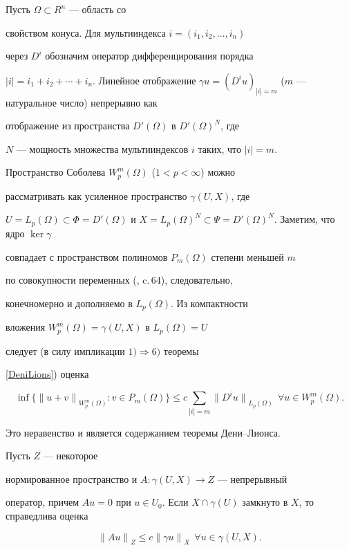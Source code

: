 \begin{examnonum}


Пусть $\Omega \subset R^n$ --- область со


свойством конуса. Для мультииндекса $i=(i_1, i_2, \dotsc, i_n)$


через $D^i$ обозначим оператор дифференцирования порядка


$|i|=i_1+i_2+\dotsb+i_n$. Линейное отображение $\gamma u =


(D^i u)_{|i|=m}$ ($m$ --- натуральное число) непрерывно как


отображение из пространства $D'(\Omega)$ в $D'(\Omega)^N$, где


$N$ --- мощность множества мультииндексов $i$ таких, что $|i|=m$.


Пространство Соболева $W^m_p(\Omega)$ ($1<p<\infty$) можно


рассматривать как усиленное пространство $\gamma(U,X)$, где


$U=L_p(\Omega) \subset \Phi=D'(\Omega)$ и $X=L_p(\Omega)^N


\subset \Psi=D'(\Omega)^N$. Заметим, что ядро $\ker \gamma$


совпадает с пространством полиномов $P_m(\Omega)$ степени меньшей $m$


по совокупности переменных (\cite{Sobolev}, c.\,64), следовательно,


конечномерно и дополняемо в $L_p(\Omega)$. Из компактности


вложения $W^m_p(\Omega)=\gamma(U,X)$ в $L_p(\Omega)=U$


следует (в силу импликации $1) \Rightarrow 6)$ теоремы


\ref{DeniLions}) оценка


$$


\inf \{ {\|u+v\|}_{W^m_p(\Omega)} : v \in P_m(\Omega) \}


\leq c \sum_{|i|=m} {\|D^i u\|}_{L_p(\Omega)} \ \ \forall u


\in W^m_p(\Omega).


$$


Это неравенство и является содержанием теоремы Дени--Лионса.


\end{examnonum}





\begin{cornonum}


Пусть $Z$ --- некоторое


нормированное пространство и $A:\gamma(U,X) \to Z$ --- непрерывный


оператор, причем $Au=0$ при $u \in U_0$. Если $X \cap


\gamma(U)$ замкнуто в $X$, то справедлива оценка


$$


{\|Au\|}_Z \le c {\|\gamma u\|}_X \ \ \forall u \in


\gamma(U,X).


$$


\end{cornonum}





